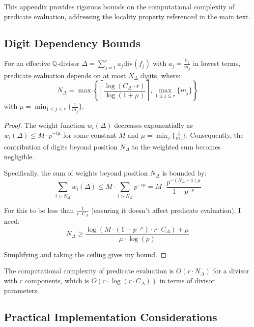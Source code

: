 This appendix provides rigorous bounds on the computational complexity of predicate evaluation, addressing the locality property referenced in the main text.

\subsection{Digit Dependency Bounds}

\begin{theorem}
For an effective $\mathbb{Q}$-divisor $\Delta = \sum_{j=1}^{r} a_j \text{div}(f_j)$ with $a_j = \frac{n_j}{m_j}$ in lowest terms, predicate evaluation depends on at most $N_\Delta$ digits, where:
$$N_\Delta = \max\left\{\left\lceil \frac{\log(C_\Delta \cdot r)}{\log(1 + \mu)} \right\rceil, \max_{1 \leq j \leq r} \{m_j\} \right\}$$
with $\mu = \min_{1 \leq j \leq r} \{\frac{1}{m_j}\}$.
\end{theorem}

\begin{proof}
The weight function $w_i(\Delta)$ decreases exponentially as $w_i(\Delta) \leq M \cdot p^{-i\mu}$ for some constant $M$ and $\mu = \min_j \{\frac{1}{m_j}\}$. Consequently, the contribution of digits beyond position $N_\Delta$ to the weighted sum becomes negligible.

Specifically, the sum of weights beyond position $N_\Delta$ is bounded by:
$$\sum_{i > N_\Delta} w_i(\Delta) \leq M \cdot \sum_{i > N_\Delta} p^{-i\mu} = M \cdot \frac{p^{-(N_\Delta+1)\mu}}{1 - p^{-\mu}}$$

For this to be less than $\frac{1}{r \cdot C_\Delta}$ (ensuring it doesn't affect predicate evaluation), I need:
$$N_\Delta \geq \frac{\log(M \cdot (1 - p^{-\mu}) \cdot r \cdot C_\Delta) + \mu}{\mu \cdot \log(p)}$$

Simplifying and taking the ceiling gives my bound.
\end{proof}

\begin{corollary}
The computational complexity of predicate evaluation is $O(r \cdot N_\Delta)$ for a divisor with $r$ components, which is $O(r \cdot \log(r \cdot C_\Delta))$ in terms of divisor parameters.
\end{corollary}

\subsection{Practical Implementation Considerations}

